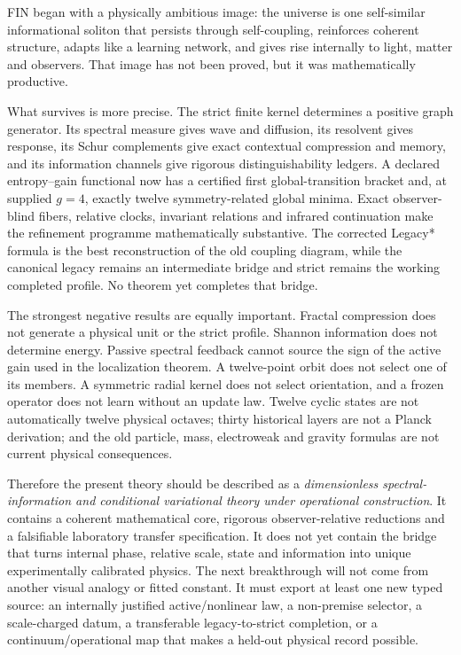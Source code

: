 \documentclass[11pt,a4paper]{article}
\theoremstyle{definition}
\theoremstyle{remark}
\begin{document}
FIN began with a physically ambitious image: the universe is one self-similar informational soliton that persists through self-coupling, reinforces coherent structure, adapts like a learning network, and gives rise internally to light, matter and observers. That image has not been proved, but it was mathematically productive.

What survives is more precise. The strict finite kernel determines a positive graph generator. Its spectral measure gives wave and diffusion, its resolvent gives response, its Schur complements give exact contextual compression and memory, and its information channels give rigorous distinguishability ledgers. A declared entropy--gain functional now has a certified first global-transition bracket and, at supplied $g=4$, exactly twelve symmetry-related global minima. Exact observer-blind fibers, relative clocks, invariant relations and infrared continuation make the refinement programme mathematically substantive. The corrected Legacy* formula is the best reconstruction of the old coupling diagram, while the canonical legacy remains an intermediate bridge and strict remains the working completed profile. No theorem yet completes that bridge.

The strongest negative results are equally important. Fractal compression does not generate a physical unit or the strict profile. Shannon information does not determine energy. Passive spectral feedback cannot source the sign of the active gain used in the localization theorem. A twelve-point orbit does not select one of its members. A symmetric radial kernel does not select orientation, and a frozen operator does not learn without an update law. Twelve cyclic states are not automatically twelve physical octaves; thirty historical layers are not a Planck derivation; and the old particle, mass, electroweak and gravity formulas are not current physical consequences.

Therefore the present theory should be described as a \emph{dimensionless spectral-information and conditional variational theory under operational construction}. It contains a coherent mathematical core, rigorous observer-relative reductions and a falsifiable laboratory transfer specification. It does not yet contain the bridge that turns internal phase, relative scale, state and information into unique experimentally calibrated physics. The next breakthrough will not come from another visual analogy or fitted constant. It must export at least one new typed source: an internally justified active/nonlinear law, a non-premise selector, a scale-charged datum, a transferable legacy-to-strict completion, or a continuum/operational map that makes a held-out physical record possible.
\end{document}
